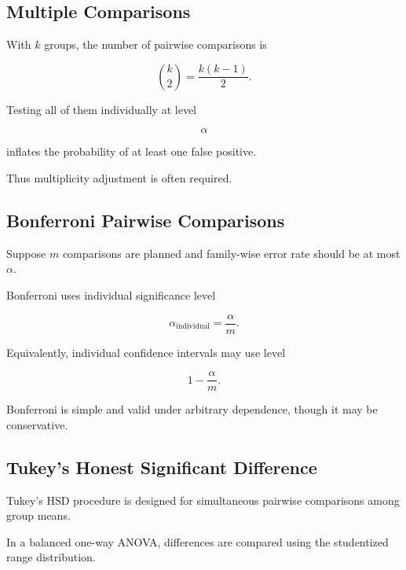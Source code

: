 \subsection{Multiple Comparisons}
\label{subsec:anova-multiple-comparisons}

With \(k\) groups, the number of pairwise comparisons is

\[
\boxed{
\binom{k}{2}
=
\frac{
k(k-1)
}{2}.
}
\]

Testing all of them individually at level

\[
\alpha
\]

inflates the probability of at least one false positive.

Thus multiplicity adjustment is often required.

\subsection{Bonferroni Pairwise Comparisons}
\label{subsec:anova-bonferroni}

Suppose \(m\) comparisons are planned and family-wise error rate should
be at most \(\alpha\).

Bonferroni uses individual significance level

\[
\boxed{
\alpha_{\text{individual}}
=
\frac{\alpha}{m}.
}
\]

Equivalently, individual confidence intervals may use level

\[
\boxed{
1-\frac{\alpha}{m}.
}
\]

Bonferroni is simple and valid under arbitrary dependence, though it may
be conservative.

\subsection{Tukey's Honest Significant Difference}
\label{subsec:tukey-hsd}

Tukey's HSD procedure is designed for simultaneous pairwise comparisons
among group means.

In a balanced one-way ANOVA, differences are compared using the
studentized range distribution.

